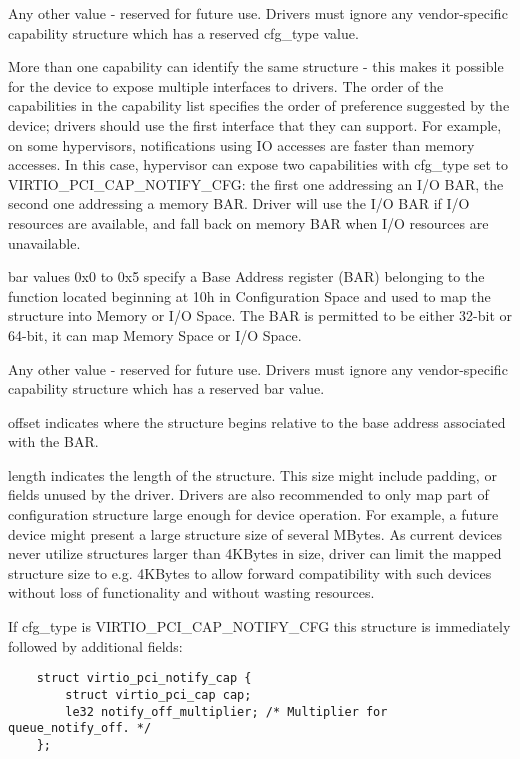        Any other value - reserved for future use. Drivers must
        ignore any vendor-specific capability structure which has
        a reserved cfg_type value.

        More than one capability can identify the same structure - this makes it
        possible for the device to expose multiple interfaces to drivers.  The order of
        the capabilities in the capability list specifies the order of preference
        suggested by the device; drivers should use the first interface that they can
        support.  For example, on some hypervisors, notifications using IO accesses are
        faster than memory accesses. In this case, hypervisor can expose two
        capabilities with cfg_type set to VIRTIO_PCI_CAP_NOTIFY_CFG:
        the first one addressing an I/O BAR, the second one addressing a memory BAR.
        Driver will use the I/O BAR if I/O resources are available, and fall back on
        memory BAR when I/O resources are unavailable.

bar
        values 0x0 to 0x5 specify a Base Address register (BAR) belonging to
        the function located beginning at 10h in Configuration Space
        and used to map the structure into Memory or I/O Space.
        The BAR is permitted to be either 32-bit or 64-bit, it can map Memory Space
        or I/O Space.

        Any other value - reserved for future use. Drivers must
        ignore any vendor-specific capability structure which has
        a reserved bar value.

offset
        indicates where the structure begins relative to the base address associated
        with the BAR.

length
        indicates the length of the structure.
        This size might include padding, or fields unused by the driver.
        Drivers are also recommended to only map part of configuration structure
        large enough for device operation.
        For example, a future device might present a large structure size of several
        MBytes.
        As current devices never utilize structures larger than 4KBytes in size,
        driver can limit the mapped structure size to e.g.
        4KBytes to allow forward compatibility with such devices without loss of
        functionality and without wasting resources.


If cfg_type is VIRTIO_PCI_CAP_NOTIFY_CFG this structure is immediately followed
by additional fields:

\begin{lstlisting}
	struct virtio_pci_notify_cap {
		struct virtio_pci_cap cap;
		le32 notify_off_multiplier;	/* Multiplier for queue_notify_off. */
	};
\end{lstlisting}

